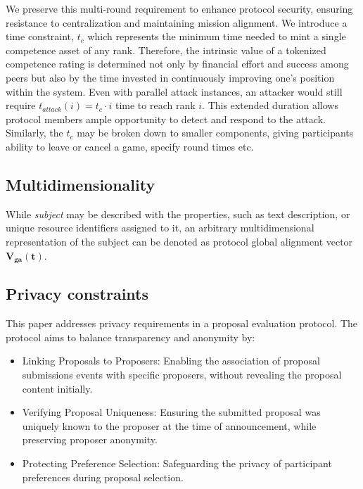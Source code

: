 \documentclass{article}
\begin{document}
\begin{CJK}{UTF8}{gbsn}
\begin{multicols}{2}
        We preserve this multi-round requirement to enhance protocol security, ensuring resistance to centralization and maintaining mission alignment. We introduce a time constraint,  $t_c$ which represents the minimum time needed to mint a single competence asset of any rank.
        Therefore, the intrinsic value of a tokenized competence rating is determined not only by financial effort and success among peers but also by the time invested in continuously improving one's position within the system. Even with parallel attack instances, an attacker would still require $t_{attack}(i) = t_c \cdot i$ time to reach rank $i$. This extended duration allows protocol members ample opportunity to detect and respond to the attack. Similarly, the $t_c$ may be broken down to smaller components, giving participants ability to leave or cancel a game, specify round times etc.
        \subsection{Multidimensionality}

        While \textit{subject} may be described with the properties, such as text description, or unique resource identifiers assigned to it, an arbitrary multidimensional representation of the subject can be denoted as protocol global alignment vector $\mathbf{V_{ga}(t)}$.  \\
        \subsection{Privacy constraints}

        This paper addresses privacy requirements in a proposal evaluation protocol. The protocol aims to balance transparency and anonymity by:
        \begin{itemize}
            \item Linking Proposals to Proposers: Enabling the association of proposal submissions events with specific proposers, without revealing the proposal content initially.
            \item Verifying Proposal Uniqueness: Ensuring the submitted proposal was uniquely known to the proposer at the time of announcement, while preserving proposer anonymity.
            \item Protecting Preference Selection: Safeguarding the privacy of participant preferences during proposal selection.

        \end{itemize}

\end{multicols}
\end{CJK}
\end{document}
